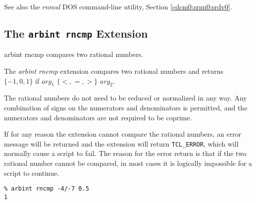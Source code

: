\begin{tclcommandseealso}
See also the \emph{rnmul} DOS command-line utility, 
Section \ref{cdcm0:srnu0:srdv0}.
\end{tclcommandseealso}


\subsection{The \texttt{arbint rncmp} Extension}
\label{cxtn0:srne0:srcm0}

\begin{tclcommandname}{arbint rncmp}%
compares two rational numbers.
\end{tclcommandname}

\begin{tclcommandsynopsis}
\end{tclcommandsynopsis}

\begin{tclcommanddescription}
The \emph{arbint rncmp} extension compares two rational numbers
and returns $\{-1, 0, 1\}$ if $arg_1$
$\{<, =, >\}$ $arg_2$.

The rational numbers do not need to be reduced or normalized in any way.
Any combination of signs on the numerators and denominators is permitted,
and the numerators and denominators are not required to be coprime.

If for any reason the extension cannot compare the rational numbers,
an error message will be returned and the extension will return
\texttt{TCL\_ERROR}, which will normally cause a script to fail.
The reason for the error return is that if the two rational number
cannot be compared, in most cases it is logically impossible for a script to
continue.
\end{tclcommanddescription}

\begin{tclcommandsampleinvocations}
\begin{scriptsize}
\begin{verbatim}
% arbint rncmp -4/-7 0.5
1
\end{verbatim}
\end{scriptsize}
\end{tclcommandsampleinvocations}


